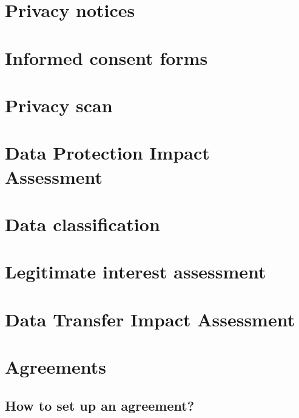 \documentclass[
]{book}
\begin{document}
\hypertarget{privacy-notices}{%
\section{Privacy notices}\label{privacy-notices}}

\hypertarget{informed-consent-forms}{%
\section{Informed consent forms}\label{informed-consent-forms}}

\hypertarget{privacy-scan}{%
\section{Privacy scan}\label{privacy-scan}}

\hypertarget{dpia}{%
\section{Data Protection Impact Assessment}\label{dpia}}

\hypertarget{data-classification}{%
\section{Data classification}\label{data-classification}}

\hypertarget{legitimate-interest-assessment}{%
\section{Legitimate interest assessment}\label{legitimate-interest-assessment}}

\hypertarget{dtia}{%
\section{Data Transfer Impact Assessment}\label{dtia}}

\hypertarget{agreements}{%
\section{Agreements}\label{agreements}}

\hypertarget{set-up-agreements}{%
\subsection{How to set up an agreement?}\label{set-up-agreements}}
\end{document}
